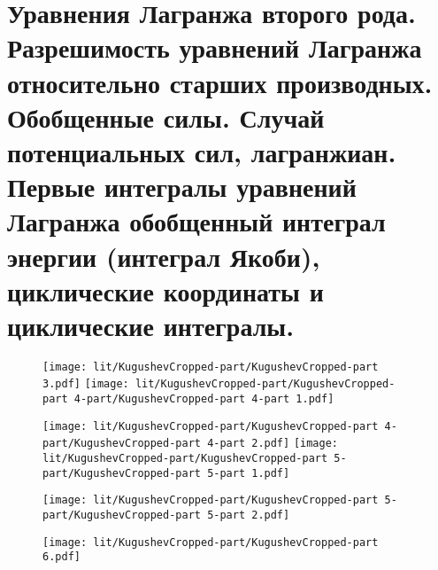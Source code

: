 \section{Уравнения Лагранжа второго рода. Разрешимость уравнений Лагранжа относительно старших производных. Обобщенные силы. Случай потенциальных сил, лагранжиан. Первые интегралы уравнений Лагранжа обобщенный интеграл энергии (интеграл Якоби), циклические координаты и циклические интегралы.}\label{chasec2}

\begin{figure}[h!]
	\noindent
	\centering
	\texttt{[image: lit/KugushevCropped-part/KugushevCropped-part 3.pdf]}
	\texttt{[image: lit/KugushevCropped-part/KugushevCropped-part 4-part/KugushevCropped-part 4-part 1.pdf]}
\end{figure}

\begin{figure}[h!]
	\noindent
	\centering
	\texttt{[image: lit/KugushevCropped-part/KugushevCropped-part 4-part/KugushevCropped-part 4-part 2.pdf]}
	\texttt{[image: lit/KugushevCropped-part/KugushevCropped-part 5-part/KugushevCropped-part 5-part 1.pdf]}
\end{figure}

\begin{figure}[h!]
	\noindent
	\centering
	\texttt{[image: lit/KugushevCropped-part/KugushevCropped-part 5-part/KugushevCropped-part 5-part 2.pdf]}
\end{figure}

\begin{figure}[h!]
	\noindent
	\centering
	\texttt{[image: lit/KugushevCropped-part/KugushevCropped-part 6.pdf]}
\end{figure}


% 
% 

\newpage